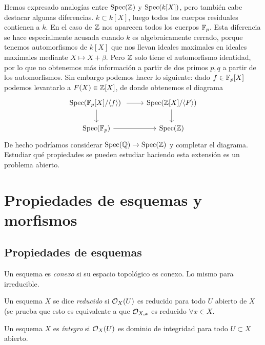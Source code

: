\documentclass[GA.tex]{subfiles}
\begin{document}
\begin{nota}
Hemos expresado analogías entre $\operatorname{Spec}(\mathbb{Z})$ y $\operatorname{Spec}(k[X])$, pero también cabe destacar algunas diferencias. $k\subset k[X]$, luego todos los cuerpos residuales contienen a $k$. En el caso de $\mathbb{Z}$ nos aparecen todos los cuerpos $\mathbb{F}_p$. Esta diferencia se hace especialmente acusada cuando $k$ es algebraicamente cerrado, porque tenemos automorfismos de $k[X]$ que nos llevan ideales maximales en ideales maximales mediante $X\mapsto X+\beta$. Pero $\mathbb{Z}$ solo tiene el automorfismo identidad, por lo que no obtenemos más información a partir de dos primos $p,q$ a partir de los automorfismos. Sin embargo podemos hacer lo siguiente: dado $f\in\mathbb{F}_p[X]$ podemos levantarlo a $F(X)\in\mathbb{Z}[X]$, de donde obtenemos el diagrama
\[
\begin{tikzcd}
\spec(\F_p[X]/\gene{f})\arrow[r]\arrow[d]\ &\spec(\Z[X]/\gene{F})\arrow[d]\\
\spec(\F_p)\arrow[r] & \spec(\Z)
\end{tikzcd}
\]
De hecho podríamos considerar $\operatorname{Spec}(\mathbb{Q})\to\operatorname{Spec}(\mathbb{Z})$ y completar el diagrama. Estudiar qué propiedades se pueden estudiar haciendo esta extensión es un problema abierto. 
\end{nota}

\section{Propiedades de esquemas y morfismos}

\subsection{Propiedades de esquemas}

\begin{defi}
Un esquema es \emph{conexo} si su espacio topológico es conexo. Lo mismo para irreducible. 
\end{defi}

\begin{defi}
Un esquema $X$ se dice \emph{reducido} si ${\mathcal O}_X(U)$ es reducido para todo $U$ abierto de $X$ (se prueba que esto es equivalente a que ${\mathcal O}_{X,x}$ es reducido $\forall x\in X$. 
\end{defi}

\begin{defi}
Un esquema $X$ es \emph{íntegro} si ${\mathcal O}_X(U)$ es dominio de integridad para todo $U\subset X$ abierto.
\end{defi}
\end{document}
